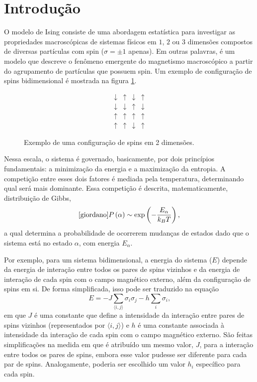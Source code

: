 \section{Introdução}

O modelo de Ising consiste de uma abordagem estatística para investigar as propriedades macroscópicas de sistemas físicos em $1$, $2$ ou $3$ dimensões compostos de diversas partículas com spin ($\sigma = \pm 1$ apenas). Em outras palavras, é um modelo que descreve o fenômeno emergente do magnetismo macroscópico a partir do agrupamento de partículas que possuem spin. Um exemplo de configuração de spins bidimensional é mostrada na figura \ref{fig:spin2d}.

\begin{figure}[ht]
\centering
\begin{equation}
\begin{matrix}
\downarrow & \uparrow & \downarrow & \uparrow \\
\downarrow & \downarrow & \uparrow & \downarrow \\
\uparrow & \uparrow & \uparrow & \uparrow \\
\uparrow & \uparrow & \downarrow & \uparrow
\end{matrix}
\end{equation}
\caption{\label{fig:spin2d}Exemplo de uma configuração de spins em 2 dimensões.}
\end{figure}

Nessa escala, o sistema é governado, basicamente, por dois princípios fundamentais: a minimização da energia e a maximização da entropia. A competição entre esses dois fatores é mediada pela temperatura, determinando qual será mais dominante. Essa competição é descrita, matematicamente, distribuição de Gibbs,
\begin{equation}\label{eq:Gibbs}\cite{giordano}
P\left(\alpha\right) \sim \exp\left(- \frac{E_{\alpha}}{k_B T}\right)\text{,}
\end{equation}
a qual determina a probabilidade de ocorrerem mudanças de estados dado que o sistema está no estado $\alpha$, com energia $E_{\alpha}$.

Por exemplo, para um sistema bidimensional, a energia do sistema ($E$) depende da energia de interação entre todos os pares de spins vizinhos e da energia de interação de cada spin com o campo magnético externo, além da configuração de spins em si. De forma simplificada, isso pode ser traduzido na equação
\begin{equation}\label{eq:energia}
E = - J \sum _{\langle i,j \rangle} \sigma_ i \sigma_ j - h \sum _i \sigma _i\text{,}
\end{equation}
em que $J$ é uma constante que define a intensidade da interação entre pares de spins vizinhos (representados por $\langle i, j \rangle$) e $h$ é uma constante associada à intensidade da interação de cada spin com o campo magnético externo. São feitas simplificações na medida em que é atribuído um mesmo valor, $J$, para a interação entre todos os pares de spins, embora esse valor pudesse ser diferente para cada par de spins. Analogamente, poderia ser escolhido um valor $h_i$ específico para cada spin.

